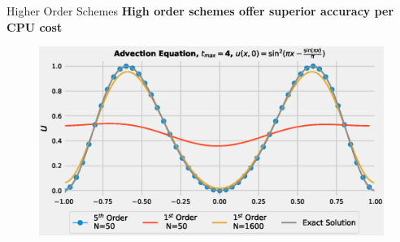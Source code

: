 \documentclass[10pt]{beamer}
\begin{document}
\begin{frame}{Higher Order Schemes}
  \centering 
  \textbf{High order schemes offer superior accuracy per CPU cost}
  
  \begin{table}[H]
    \centering
      \tabcolsep=0.3cm
  \end{table}
  \begin{figure}[H]
      \centering
      \includegraphics[scale=0.5]{AdvectionHighOrderComparison2.eps}
    \end{figure}
\end{frame}
\end{document}
